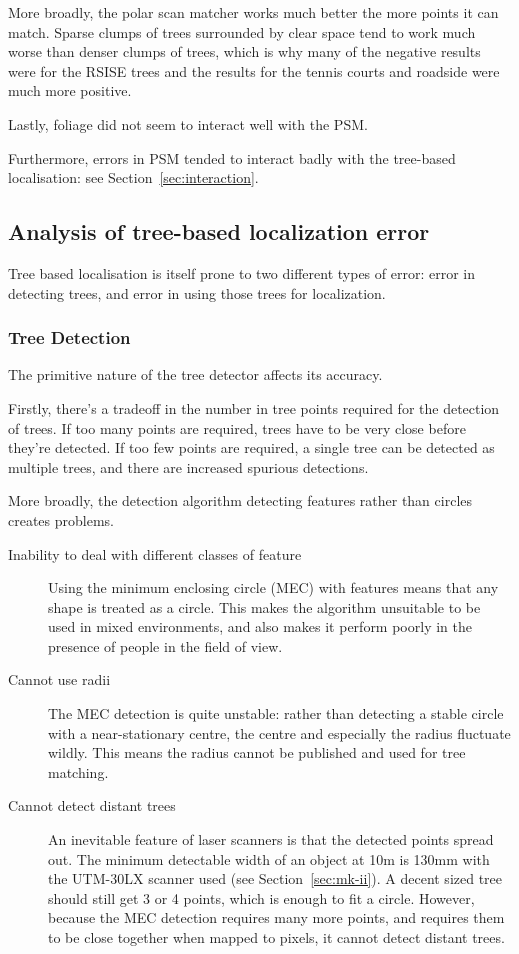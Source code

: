 \documentclass[12pt,oneside,a4paper]{book}
\begin{document}
More broadly, the polar scan matcher works much better the more points
it can match. Sparse clumps of trees surrounded by clear space tend to
work much worse than denser clumps of trees, which is why many of the
negative results were for the RSISE trees and the results for the
tennis courts and roadside were much more positive.

Lastly, foliage did not seem to interact well with the PSM.

Furthermore, errors in PSM tended to interact badly with the
tree-based localisation: see Section~\ref{sec:interaction}.

\subsection{Analysis of tree-based localization error}
\label{sec:tree-error}

Tree based localisation is itself prone to two different types of
error: error in detecting trees, and error in using those trees for
localization.

\subsubsection{Tree Detection}
\label{sec:tree-detection}

The primitive nature of the tree detector affects its accuracy. 

Firstly, there's a tradeoff in the number in tree points required for
the detection of trees. If too many points are required, trees have to be very
close before they're detected. If too few points are required, a
single tree can be detected as multiple trees, and there are increased spurious detections.

More broadly, the detection algorithm detecting features rather than
circles creates problems.

\begin{description}
\item[Inability to deal with different classes of feature] Using the
  minimum enclosing circle (MEC) with features means that any shape is
  treated as a circle. This makes the algorithm unsuitable to be used
  in mixed environments, and also makes it perform poorly in the
  presence of people in the field of view.
\item[Cannot use radii] The MEC detection is quite unstable: rather
  than detecting a stable circle with a near-stationary centre, the
  centre and especially the radius fluctuate wildly. This means the
  radius cannot be published and used for tree matching.
\item[Cannot detect distant trees] An inevitable feature of laser
  scanners is that the detected points spread out. The minimum
  detectable width of an object at 10m is 130mm with the UTM-30LX
  scanner used (see Section~\ref{sec:mk-ii}). A decent sized tree
  should still get 3 or 4 points, which is enough to fit a
  circle. However, because the MEC detection requires many more
  points, and requires them to be close together when mapped to
  pixels, it cannot detect distant trees.
\end{description}
\end{document}
